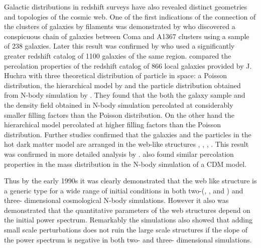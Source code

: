 Galactic distributions in redshift surveys have also revealed distinct geometries and topologies of the cosmic web. One of the first indications of the connection of the clusters of galaxies by filaments was demonstrated by \cite{Gregory1978} who discovered a conspicuous chain of galaxies between Coma and A1367 clusters using a sample of 238 galaxies. Later  this result was confirmed by \cite{Lapparent1986} who used a significantly greater redshift catalog of 1100 galaxies of the same region. \cite{Zeldovich1982} compared the percolation properties of the redshift catalog of 866 local galaxies provided by J. Huchra with three theoretical distribution of particle in space: a Poisson distribution, the  hierarchical model by \cite{Soneira1978} and the particle distribution obtained from N-body simulation by \cite{Klypin1983a}.  They found that the both the galaxy sample and the density field obtained in N-body simulation percolated at considerably smaller filling factors  than  the Poisson distribution. On the other hand the  hierarchical model percolated at higher filling factors  than  the Poisson distribution. Further studies confirmed that the galaxies and the particles in the hot dark matter  model are arranged in the web-like structures \cite{Zeldovich1982}, \cite{Shandarin1983}, \cite{Shandarin1983b}, \cite{Shandarin1984}. This result was confirmed in more detailed analysis by \cite{Einasto1984}. \cite{Melott1983b} also found similar percolation properties in the mass distribution in the N-body simulation of a CDM model.
 
Thus by the  early 1990s it was clearly demonstrated that the web like structure is a generic type for a wide range of initial conditions in both two-(\citealt{Doroshkevich1980}, \citealt{Doroshkevich1989}, \citealt{Melott1990} and \citealt{Beacom1991}) and three- dimensional \citep{Melott1993} cosmological N-body simulations. However it also was demonstrated that the quantitative parameters of the web structures depend on the initial power spectrum. Remarkably the simulations also showed that  adding small scale perturbations does not ruin the large scale structures if the slope of the power spectrum is negative in both two- and three- dimensional simulations.

